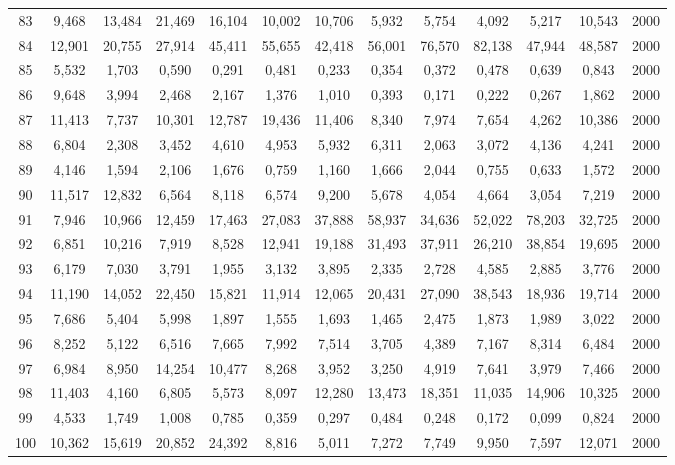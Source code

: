 {\begin{longtable}{ >{\footnotesize}ccccccccccccc}
83  & 9,468  & 13,484 & 21,469 & 16,104 & 10,002 & 10,706 & 5,932  & 5,754  & 4,092  & 5,217  & 10,543 & 2000 \\
84  & 12,901 & 20,755 & 27,914 & 45,411 & 55,655 & 42,418 & 56,001 & 76,570 & 82,138 & 47,944 & 48,587 & 2000 \\
85  & 5,532  & 1,703  & 0,590  & 0,291  & 0,481  & 0,233  & 0,354  & 0,372  & 0,478  & 0,639  & 0,843  & 2000 \\
86  & 9,648  & 3,994  & 2,468  & 2,167  & 1,376  & 1,010  & 0,393  & 0,171  & 0,222  & 0,267  & 1,862  & 2000 \\
87  & 11,413 & 7,737  & 10,301 & 12,787 & 19,436 & 11,406 & 8,340  & 7,974  & 7,654  & 4,262  & 10,386 & 2000 \\
88  & 6,804  & 2,308  & 3,452  & 4,610  & 4,953  & 5,932  & 6,311  & 2,063  & 3,072  & 4,136  & 4,241  & 2000 \\
89  & 4,146  & 1,594  & 2,106  & 1,676  & 0,759  & 1,160  & 1,666  & 2,044  & 0,755  & 0,633  & 1,572  & 2000 \\
90  & 11,517 & 12,832 & 6,564  & 8,118  & 6,574  & 9,200  & 5,678  & 4,054  & 4,664  & 3,054  & 7,219  & 2000 \\
91  & 7,946  & 10,966 & 12,459 & 17,463 & 27,083 & 37,888 & 58,937 & 34,636 & 52,022 & 78,203 & 32,725 & 2000 \\
92  & 6,851  & 10,216 & 7,919  & 8,528  & 12,941 & 19,188 & 31,493 & 37,911 & 26,210 & 38,854 & 19,695 & 2000 \\
93  & 6,179  & 7,030  & 3,791  & 1,955  & 3,132  & 3,895  & 2,335  & 2,728  & 4,585  & 2,885  & 3,776  & 2000 \\
94  & 11,190 & 14,052 & 22,450 & 15,821 & 11,914 & 12,065 & 20,431 & 27,090 & 38,543 & 18,936 & 19,714 & 2000 \\
95  & 7,686  & 5,404  & 5,998  & 1,897  & 1,555  & 1,693  & 1,465  & 2,475  & 1,873  & 1,989  & 3,022  & 2000 \\
96  & 8,252  & 5,122  & 6,516  & 7,665  & 7,992  & 7,514  & 3,705  & 4,389  & 7,167  & 8,314  & 6,484  & 2000 \\
97  & 6,984  & 8,950  & 14,254 & 10,477 & 8,268  & 3,952  & 3,250  & 4,919  & 7,641  & 3,979  & 7,466  & 2000 \\
98  & 11,403 & 4,160  & 6,805  & 5,573  & 8,097  & 12,280 & 13,473 & 18,351 & 11,035 & 14,906 & 10,325 & 2000 \\
99  & 4,533  & 1,749  & 1,008  & 0,785  & 0,359  & 0,297  & 0,484  & 0,248  & 0,172  & 0,099  & 0,824  & 2000 \\
100 & 10,362 & 15,619 & 20,852 & 24,392 & 8,816  & 5,011  & 7,272  & 7,749  & 9,950  & 7,597  & 12,071 & 2000 \\ \hline
\end{longtable}
}

